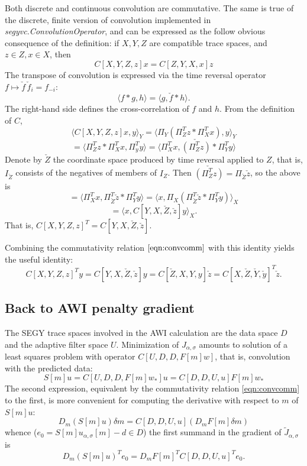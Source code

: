 Both discrete and continuous convolution are commutative. The same is true of the discrete, finite version of convolution implemented in {\em segyvc.ConvolutionOperator}, and can be expressed as the follow obvious consequence of the definition: if $X, Y, Z$ are compatible trace spaces, and $z \in Z, x \in X$, then
\begin{equation}
C[X,Y,Z,z]x = C[Z,Y,X,x]z
\label{eqn:convcomm}
\end{equation}
The transpose of convolution is expressed via the time reversal operator $f \mapsto \check{f}\, \check{f}_i = f_{-i}$:  
$$
\langle f*g,h \rangle = \langle g, \check{f}*h \rangle.
$$ 
The right-hand side defines the cross-correlation of $f$ and $h$. From the definition of $C$,
$$
\langle C[X,Y,Z,z]x, y\rangle_Y = \langle \Pi_Y(\Pi_Z^T z * \Pi_X^T x), y \rangle_Y
$$
$$
= \langle \Pi_Z^T z * \Pi_X^T x, \Pi_y^T y \rangle = \langle \Pi_X^T x, \check{(\Pi_Z^T z)}* \Pi_Y^T y \rangle
$$
Denote by $\check{Z}$ the coordinate space produced by time reversal applied to $Z$, that is, $I_{\check{Z}}$ consists of the negatives of members of $I_Z$. Then $\check{(\Pi_Z^T z)}=\Pi_{\check{Z}}\check{z}$, so the above is
$$
=\langle \Pi_X^T x, \Pi_{\check{Z}}^T \check{z} * \Pi_Y^T y \rangle =\langle x, \Pi_X(\Pi_{\check{Z}}^T \check{z} * \Pi_Y^T y) \rangle_X
$$
$$
= \langle x, C[Y,X,\check{Z},\check{z}]y \rangle_X.
$$
That is, $C[X,Y,Z,z]^T = C[Y,X,\check{Z},\check{z}]$.

Combining the commutativity relation $\ref{eqn:convcomm}$ with this identity yields the useful identity:
\begin{equation}
C[X,Y,Z,z]^Ty = C[Y,X,\check{Z},\check{z}]y =
C[\check{Z},X,Y,y]\check{z} =
C[X,\check{Z},\check{Y},\check{y}]^T\check{z}.
\label{eqn:convcommtransp}
\end{equation}

\subsection{Back to AWI penalty gradient}

The SEGY trace spaces involved in the AWI calculation are the data space $D$ and the adaptive filter space $U$. Minimization of $J_{\alpha,\sigma}$ amounts to solution of a least squares problem with operator $C[U,D,D,F[m]w]$, that is, convolution with the predicted data:
$$
S[m]u = C[U,D,D,F[m]w_*]u = C[D,D,U,u]F[m]w_*
$$
The second expression, equivalent by the commutativity relation \ref{eqn:convcomm} to the first, is more convenient for computing the derivative with respect to $m$ of $S[m]u$:
$$
D_m(S[m]u) \delta m = C[D,D,U,u](D_mF[m]\delta m)
$$
whence ($e_0 = S[m]u_{\alpha,\sigma}[m]-d \in D$) the first summand in the gradient of $\tilde{J}_{\alpha,\sigma}$ is
$$
D_m(S[m]u)^T e_0 = D_mF[m]^TC[D,D,U,u]^Te_0.
$$

